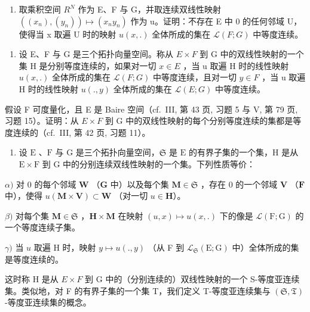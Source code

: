\begin{enumerate}
\def\labelenumi{\alph{enumi})}
\setcounter{enumi}{1}
\tightlist
\item
  取乘积空间 \(R^{N}\) 作为 E、F 与 G，并取连续双线性映射 \(((x_{n}), (y_{n})) \mapsto (x_{n}y_{n})\) 作为 u。证明：不存在 E 中 0 的任何邻域 U，使得当 x 取遍 U 时的映射 \(u(x, .)\) 全体所成的集在 \(\mathcal{L}(F; G)\) 中等度连续。
\end{enumerate}

\begin{enumerate}
\def\labelenumi{\arabic{enumi})}
\setcounter{enumi}{5}
\tightlist
\item
  设 E、F 与 G 是三个拓扑向量空间。称从 \(E \times F\) 到 G 中的双线性映射的一个集 H 是分别等度连续的，如果对一切 \(x \in E\) ，当 u 取遍 H 时的线性映射 \(u(x, .)\) 全体所成的集在 \(\mathcal{L}(F; G)\) 中等度连续，且对一切 \(y \in F\) ，当 u 取遍 H 时的线性映射 \(u(. , y)\) 全体所成的集在 \(\mathcal{L}(E; G)\) 中等度连续。
\end{enumerate}

假设 F 可度量化，且 E 是 Baire 空间（cf.~III, 第 43 页, 习题 5 与 V, 第 79 页, 习题 15）。证明：从 \(E \times F\) 到 G 中的双线性映射的每个分别等度连续的集都是等度连续的（cf.~III, 第 42 页, 习题 11）。

\begin{enumerate}
\def\labelenumi{\arabic{enumi})}
\setcounter{enumi}{6}
\tightlist
\item
  设 \(\mathrm{E}\) 、\(\mathrm{F}\) 与 \(\mathrm{G}\) 是三个拓扑向量空间，\(\mathfrak{S}\) 是 \(\mathrm{E}\) 的有界子集的一个集，\(\mathrm{H}\) 是从 \(\mathrm{E} \times \mathrm{F}\) 到 \(\mathrm{G}\) 中的分别连续双线性映射的一个集。下列性质等价：
\end{enumerate}

\(\alpha)\) 对 0 的每个邻域 \(\mathbf{W}\) （\(\mathbf{G}\) 中）以及每个集 \(\mathbf{M} \in \mathfrak{S}\) ，存在 0 的一个邻域 \(\mathbf{V}\) （\(\mathbf{F}\) 中），使得 \(u(\mathbf{M} \times \mathbf{V}) \subset \mathbf{W}\) （对一切 \(u \in \mathbf{H}\)）。

\(\beta)\) 对每个集 \(\mathbf{M} \in \mathfrak{S}\) ，\(\mathbf{H} \times \mathbf{M}\) 在映射 \((u, x) \mapsto u(x, .)\) 下的像是 \(\mathcal{L}(\mathrm{F}; \mathrm{G})\) 的一个等度连续子集。

\(\gamma)\) 当 \(u\) 取遍 H 时，映射 \(y \mapsto u(., y)\) （从 F 到 \(\mathcal{L}_{\mathfrak{S}}(\mathrm{E}; \mathrm{G})\) 中）全体所成的集是等度连续的。

这时称 H 是从 \(E \times F\) 到 G 中的（分别连续的）双线性映射的一个 S-等度亚连续集。类似地，对 F 的有界子集的一个集 T，我们定义 T-等度亚连续集与 \((\mathfrak{S}, \mathfrak{T})\) -等度亚连续集的概念。


